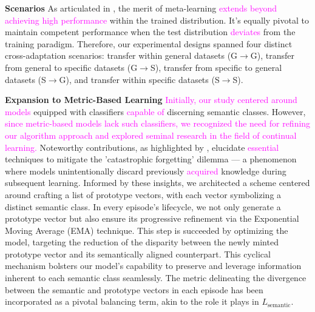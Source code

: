 \documentclass[letterpaper]{article} %
\newcommand{\yr}[1]{\textcolor{magenta}{#1}}
\begin{document}
{\textbf{Scenarios} As articulated in \cite{nonepisodic:transferminitocars}, the merit of meta-learning \yr{extends beyond achieving high performance}  
within the trained distribution. It's equally pivotal to maintain competent performance when the test distribution \yr{deviates} from the training paradigm. Therefore, our experimental designs spanned four distinct cross-adaptation scenarios: transfer within general datasets (G$\rightarrow$G), transfer from general to specific datasets (G$\rightarrow$S), transfer from specific to general datasets (S$\rightarrow$G), and transfer within specific datasets (S$\rightarrow$S).

\textbf{Expansion to Metric-Based Learning} 
\yr{Initially, our study centered around models}
equipped with classifiers \yr{capable of} %
discerning semantic classes. However, \yr{since metric-based models lack such classifiers, we recognized the need for refining our algorithm approach and explored seminal research in the field of continual learning.} %
Noteworthy contributions, as highlighted by \cite{continual:catastrophic,catastrophygunbon,continual:memoryrehearsal}, elucidate \yr{essential} techniques to mitigate the 'catastrophic forgetting' dilemma — a phenomenon where models unintentionally discard previously \yr{acquired} knowledge during subsequent learning.
Informed by these insights, we architected a scheme centered around crafting a list of prototype vectors, with each vector symbolizing a distinct semantic class. In every episode's lifecycle, we not only generate a prototype vector but also ensure its progressive refinement via the Exponential Moving Average (EMA) technique. This step is succeeded by optimizing the model, targeting the reduction of the disparity between the newly minted prototype vector and its semantically aligned counterpart. This cyclical mechanism bolsters our model's capability to preserve and leverage information inherent to each semantic class seamlessly. The metric delineating the divergence between the semantic and prototype vectors in each episode has been incorporated as a pivotal balancing term, akin to the role it plays in $L_\text{semantic}$.

}
\end{document}
